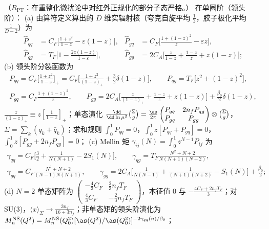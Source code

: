 \begin{proposition}\label{prop:pdf-lo-kernels}
（$R_{\mathrm{PT}}$：在重整化微扰论中对红外正规化的部分子态严格。）
在单圈阶（领头阶）：
(a) 由算符定义算出的 $D$ 维实辐射核（夸克自旋平均 $\frac12$，胶子极化平均 $\frac1{D-2}$）为
\begin{equation}\label{eq:pdf-Phat}
\begin{aligned}
\hat P_{qq}&=C_F\Big[\frac{1+z^2}{1-z}-\varepsilon(1-z)\Big], &
\hat P_{gq}&=C_F\Big[\frac{1+(1-z)^2}{z}-\varepsilon z\Big],\\
\hat P_{qg}&=T_F\Big[1-\frac{2z(1-z)}{1-\varepsilon}\Big], &
\hat P_{gg}&=2C_A\Big[\frac{z}{1-z}+\frac{1-z}{z}+z(1-z)\Big];
\end{aligned}
\end{equation}
(b) 领头阶分裂函数为
\begin{equation}\label{eq:pdf-Pij}
\begin{gathered}
P_{qq}=C_F\Big[\frac{1+z^2}{1-z}\Big]_+=C_F\Big[\frac{1+z^2}{(1-z)_+}+\frac32\delta(1-z)\Big],\qquad P_{qg}=T_F\big[z^2+(1-z)^2\big],\\
P_{gq}=C_F\frac{1+(1-z)^2}{z},\qquad P_{gg}=2C_A\Big[\frac{z}{(1-z)_+}+\frac{1-z}{z}+z(1-z)\Big]+\frac{\beta_0}{2}\delta(1-z),
\end{gathered}
\end{equation}
$\frac{z}{(1-z)_+}\equiv z[\frac1{1-z}]_+$；单态演化 $\frac{\dd}{\dd\ln\mu^2}\binom{\Sigma}{g}=\frac{\as}{2\pi}\begin{pmatrix}P_{qq}&2n_fP_{qg}\\P_{gq}&P_{gg}\end{pmatrix}\otimes\binom{\Sigma}{g}$，$\Sigma=\sum_k(q_k+\bar q_k)$；求和规则 $\int_0^1P_{qq}=0$，$\int_0^1z[P_{qq}+P_{gq}]=0$，$\int_0^1z[P_{gg}+2n_fP_{qg}]=0$；
(c) Mellin 矩 $\gamma_{ij}(N)=\int_0^1z^{N-1}P_{ij}$ 为
\begin{equation}\label{eq:pdf-gammas}
\begin{gathered}
\gamma_{qq}=C_F\Big[\frac32+\frac{1}{N(N+1)}-2S_1(N)\Big],\qquad \gamma_{qg}=T_F\frac{N^2+N+2}{N(N+1)(N+2)},\\
\gamma_{gq}=C_F\frac{N^2+N+2}{(N-1)N(N+1)},\qquad \gamma_{gg}=2C_A\Big[\frac{1}{N(N-1)}+\frac{1}{(N+1)(N+2)}-S_1(N)\Big]+\frac{\beta_0}{2};
\end{gathered}
\end{equation}
(d) $N=2$ 单态矩阵为 $\begin{pmatrix}-\frac43C_F&\frac23n_fT_F\\\frac43C_F&-\frac23n_fT_F\end{pmatrix}$，本征值 $0$ 与 $-\frac{4C_F+2n_fT_F}{3}$；对 SU(3)，$\langle x\rangle_\Sigma\to\frac{3n_f}{16+3n_f}$；非单态矩的领头阶演化为 $M^{\mathrm{NS}}_n(Q^2)=M^{\mathrm{NS}}_n(Q_0^2)[\as(Q^2)/\as(Q_0^2)]^{-2\gamma_{qq}(n)/\beta_0}$；

\end{proposition}
